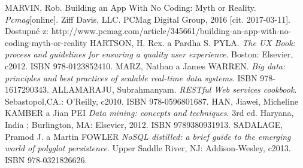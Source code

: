\begin{thebibliography}{99}

MARVIN, Rob. Building an App With No Coding: Myth or Reality. 
\textit{Pcmag}[online].
 Ziff Davis, LLC. PCMag Digital Group, 2016 [cit. 2017-03-11]. Dostupné z: http://www.pcmag.com/article/345661/building-an-app-with-no-coding-myth-or-reality
HARTSON, H. Rex. a Pardha S. PYLA.
\textit{The UX Book: process and guidelines for ensuring a quality user experience}. 
Boston: Elsevier, c2012. ISBN 978-0123852410.
MARZ, Nathan a James WARREN.
\textit{Big data: principles and best practices of scalable real-time data systems}. 
ISBN 978-1617290343.
ALLAMARAJU, Subrahmanyam.
\textit{RESTful Web services cookbook}.
Sebastopol,CA.: O'Reilly, c2010. ISBN 978-0596801687.
HAN, Jiawei, Micheline KAMBER a Jian PEI
\textit{Data mining: concepts and techniques}.
3rd ed. Haryana, India ; Burlington, MA: Elsevier, 2012. ISBN 9789380931913.
SADALAGE, Pramod J. a Martin FOWLER
\textit{NoSQL distilled: a brief guide to the emerging world of polyglot persistence}.
Upper Saddle River, NJ: Addison-Wesley, c2013. ISBN 978-0321826626.

\end{thebibliography}
